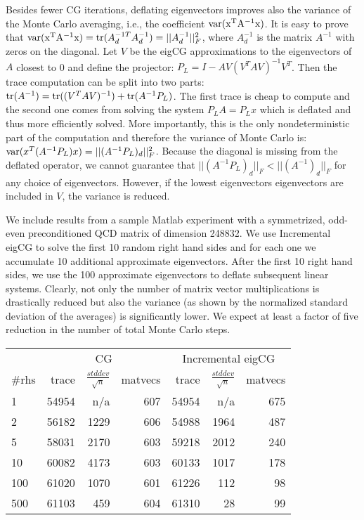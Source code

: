 \documentclass{report}
\begin{document}
Besides fewer CG iterations, deflating eigenvectors improves also the
variance of the Monte Carlo averaging, i.e.,
the coefficient ${\rm var(x^TA^{-1}x)}$. It is easy to prove
that ${\rm var(x^TA^{-1}x)} = {\rm tr}(A_d^{-1 T}A_d^{-1})
= ||A_d^{-1}||^2_F$,
where $A_d^{-1}$ is the matrix $A^{-1}$ with zeros on the diagonal.
Let $V$ be the eigCG approximations to the eigenvectors of $A$ closest to 0
and define the projector: $P_L = I - AV(V^TAV)^{-1}V^T$. Then the trace
computation can be split into two parts:
${\rm tr}(A^{-1}) = {\rm tr}((V^TAV)^{-1}) + {\rm tr}(A^{-1}P_L)$.
The first trace is cheap to compute and the second one comes from solving
the system $P_L A = P_L x$ which is deflated and thus more efficiently solved.
More importantly, this is the only nondeterministic part of the computation
and therefore the variance of Monte Carlo is:
${\rm var}(x^T(A^{-1}P_L)x) = || (A^{-1}P_L)_d||^2_F$.
Because the diagonal is missing from the deflated operator,
we cannot guarantee that $|| (A^{-1}P_L)_d||_F < || (A^{-1})_d||_F$
for any choice of eigenvectors. However, if the lowest eigenvectors
eigenvectors are included in $V$, the variance is reduced.

We include results from a sample Matlab experiment with a symmetrized, odd-even
preconditioned QCD matrix of dimension 248832. We use Incremental eigCG
to solve the first 10 random right hand sides and for each one we accumulate
10 additional approximate eigenvectors. After the first 10 right hand sides,
we use the 100 approximate eigenvectors to deflate subsequent linear systems.
Clearly, not only the number of matrix vector multiplications is drastically
reduced but also the variance (as shown by the normalized standard deviation
of the averages) is significantly lower. We expect at least a factor
of five reduction in the number of total Monte Carlo steps.

\begin{center}
\begin{tabular}{l|rrr|rrr}
& \multicolumn{3}{c|}{CG} & \multicolumn{3}{c}{Incremental eigCG} \\
\#rhs & trace & $\frac{std dev}{\sqrt{n}}$ & matvecs &trace & $\frac{std
dev}{\sqrt{n}}$ & matvecs \\
1 & 54954 & n/a & 607 & 54954 & n/a & 675 \\
2 & 56182 & 1229 & 606 & 54988 & 1964 & 487 \\
5 & 58031 & 2170 & 603 & 59218 & 2012 & 240 \\
10 & 60082 & 4173 & 603 & 60133 & 1017 & 178 \\
100 & 61020 & 1070 & 601 & 61226 & 112 & 98 \\
500 & 61103 & 459 & 604 & 61310 & 28 & 99
\end{tabular}
\end{center}
\end{document}
